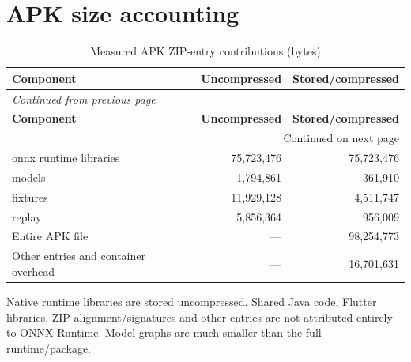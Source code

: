 \documentclass[10pt,a4paper]{article}
\begin{document}
\section{APK size accounting}
\begingroup\small\setlength{\tabcolsep}{4pt}\renewcommand{\arraystretch}{1.12}
\begin{longtable}{@{}lrr@{}}
\caption{Measured APK ZIP-entry contributions (bytes)}\\
\toprule
\textbf{Component} & \textbf{Uncompressed} & \textbf{Stored/\allowbreak{}compressed} \\
\midrule\endfirsthead
\multicolumn{3}{l}{\small\itshape Continued from previous page}\\
\toprule
\textbf{Component} & \textbf{Uncompressed} & \textbf{Stored/\allowbreak{}compressed} \\
\midrule\endhead
\midrule\multicolumn{3}{r}{\small Continued on next page}\\\endfoot
\bottomrule\endlastfoot
onnx runtime libraries & 75,723,476 & 75,723,476 \\
models & 1,794,861 & 361,910 \\
fixtures & 11,929,128 & 4,511,747 \\
replay & 5,856,364 & 956,009 \\
Entire APK file & --- & 98,254,773 \\
Other entries and container overhead & --- & 16,701,631 \\
\end{longtable}\endgroup
Native runtime libraries are stored uncompressed. Shared Java code, Flutter libraries, ZIP alignment/\allowbreak{}signatures and other entries are not attributed entirely to ONNX Runtime. Model graphs are much smaller than the full runtime/\allowbreak{}package.
\end{document}
